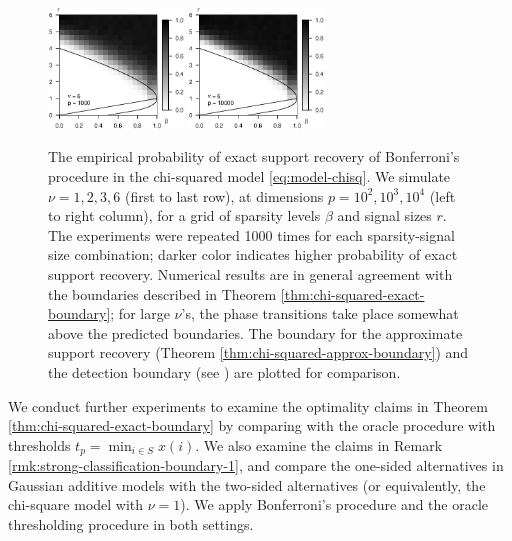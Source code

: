 \begin{figure}
      \includegraphics[width=0.32\textwidth]{./sim_strong_boundary/simulated_phase_diagram_chi-squared_nu6_p1000.eps}
      \includegraphics[width=0.32\textwidth]{./sim_strong_boundary/simulated_phase_diagram_chi-squared_nu6_p10000.eps}
      \caption{The empirical probability of exact support recovery of Bonferroni's procedure in the chi-squared model \eqref{eq:model-chisq}. 
      We simulate $\nu=1, 2, 3, 6$ (first to last row), at dimensions $p=10^2, 10^3, 10^4$ (left to right column), for a grid of sparsity levels $\beta$ and signal sizes $r$.
      The experiments were repeated 1000 times for each sparsity-signal size combination; darker color indicates higher probability of exact support recovery.  
      Numerical results are in general agreement with the boundaries described in Theorem \ref{thm:chi-squared-exact-boundary}; for large $\nu$'s, the phase transitions take place somewhat above the predicted boundaries.
      The boundary for the approximate support recovery (Theorem \ref{thm:chi-squared-approx-boundary}) and the detection boundary (see \citep{donoho2004higher}) are plotted for comparison.} 
      \label{fig:phase-simulated-chi-squared}
\end{figure}

We conduct further experiments to examine the optimality claims in Theorem \ref{thm:chi-squared-exact-boundary} by comparing with the oracle procedure with thresholds $t_p=\min_{i\in S}x(i)$.
We also examine the claims in Remark \ref{rmk:strong-classification-boundary-1}, and compare the one-sided alternatives in Gaussian additive models with the two-sided alternatives (or equivalently, the chi-square model with $\nu=1$).
We apply Bonferroni's procedure and the oracle thresholding procedure in both settings.

